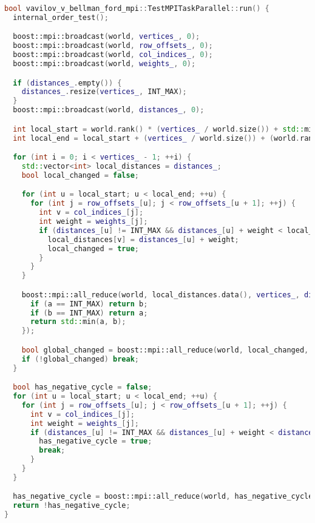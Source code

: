 \documentclass[12pt]{article}
\begin{document}
\begin{lstlisting}[language=C++, caption={Параллельная MPI-реализация алгоритма Беллмана–Форда}, breaklines=true]
bool vavilov_v_bellman_ford_mpi::TestMPITaskParallel::run() {
  internal_order_test();

  boost::mpi::broadcast(world, vertices_, 0);
  boost::mpi::broadcast(world, row_offsets_, 0);
  boost::mpi::broadcast(world, col_indices_, 0);
  boost::mpi::broadcast(world, weights_, 0);

  if (distances_.empty()) {
    distances_.resize(vertices_, INT_MAX);
  }
  boost::mpi::broadcast(world, distances_, 0);

  int local_start = world.rank() * (vertices_ / world.size()) + std::min(world.rank(), vertices_ % world.size());
  int local_end = local_start + (vertices_ / world.size()) + (world.rank() < vertices_ % world.size() ? 1 : 0);

  for (int i = 0; i < vertices_ - 1; ++i) {
    std::vector<int> local_distances = distances_;
    bool local_changed = false;

    for (int u = local_start; u < local_end; ++u) {
      for (int j = row_offsets_[u]; j < row_offsets_[u + 1]; ++j) {
        int v = col_indices_[j];
        int weight = weights_[j];
        if (distances_[u] != INT_MAX && distances_[u] + weight < local_distances[v]) {
          local_distances[v] = distances_[u] + weight;
          local_changed = true;
        }
      }
    }

    boost::mpi::all_reduce(world, local_distances.data(), vertices_, distances_.data(), [](int a, int b) {
      if (a == INT_MAX) return b;
      if (b == INT_MAX) return a;
      return std::min(a, b);
    });

    bool global_changed = boost::mpi::all_reduce(world, local_changed, std::logical_or<>());
    if (!global_changed) break;
  }

  bool has_negative_cycle = false;
  for (int u = local_start; u < local_end; ++u) {
    for (int j = row_offsets_[u]; j < row_offsets_[u + 1]; ++j) {
      int v = col_indices_[j];
      int weight = weights_[j];
      if (distances_[u] != INT_MAX && distances_[u] + weight < distances_[v]) {
        has_negative_cycle = true;
        break;
      }
    }
  }

  has_negative_cycle = boost::mpi::all_reduce(world, has_negative_cycle, std::logical_or<>());
  return !has_negative_cycle;
}
\end{lstlisting}
\end{document}
